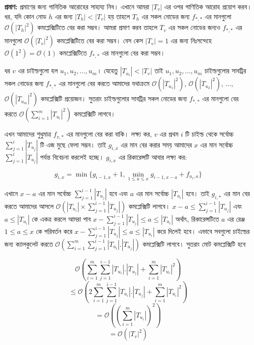 \textbf{প্রমাণ:}
প্রমাণের জন্য গানিতিক আরোহের সাহায্য নিব। এখানে আমরা \(|T_{v}|\) এর ওপর গাণিতিক আরোহ প্রয়োগ করব। ধর, যদি কোন নোড \(h\) এর জন্য \(|T_{h}| < |T_{v}|\) হয় তাহলে \(T_{h}\) এর সকল নোডের জন্য \(f_{*, *}\) এর মানগুলো \(\mathcal{O}(|T_{h}|^{2})\) কমপ্লেক্সিটিতে বের করা সম্ভব।  আমরা প্রমাণ করব তাহলে \(T_{v}\) এর সকল নোডের জন্যও \(f_{*, *}\) এর মানগুলো \(\mathcal{O}(|T_{v}|^{2})\) কমপ্লেক্সিটিতে বের করা সম্ভব। বেস কেস \(|T_{v}| = 1\) এর জন্য নিঃসন্দেহে \(\mathcal{O} (1^{2}) = \mathcal{O} (1)\) কমপ্লেক্সিটিতে \(f_{*, *}\) এর মানগুলো বের করা সম্ভব।  

ধর \(v\) এর চাইল্ডগুলো হল \(u_{1}, u_{2}, \dots, u_{m}\)। যেহেতু \(|T_{u_{i}}| < |T_{v}|\) তাই \(u_{1}, u_{2}, \dots, u_{m}\) চাইল্ডগুলোর সাবট্রির সকল নোডের জন্য \(f_{*, *}\) এর মানগুলো বের করতে আমাদের যথাক্রমে $\mathcal{O}(|T_{u_{1}}|^{2})$, $\mathcal{O}(|T_{u_{2}}|^{2})$, $\dots$, $\mathcal{O}(|T_{u_{m}}|^{2})$ কমপ্লেক্সিটি প্রয়োজন। সুতরাং চাইল্ডগুলোর সাবট্রির সকল নোডের জন্য \(f_{*, *}\) এর মানগুলো বের করতে \(\mathcal{O} \left ( \sum_{i = 1}^{m} |T_{u_{i}}|^{2} \right )\) কমপ্লেক্সিটি লাগবে। 

এখন আমাদের শুধুমাত্র \(f_{v, *}\) এর মানগুলো বের করা বাকি। লক্ষ্য কর, \(v\) এর প্রথম \(i\) টি চাইল্ড থেকে সর্বোচ্চ \(\sum_{j = 1}^{i} |T_{u_{j}}|\) টি এজ মুছে ফেলা সম্ভব। তাই \(g_{i, x}\) এর মান বের করার সময় আমাদের \(x\) এর মান সর্বোচ্চ \(\sum_{j = 1}^{i} |T_{u_{j}}|\) পর্যন্ত বিবেচনা করলেই হচ্ছে। \(g_{i, x}\) এর রিকারেন্সটি আবার লক্ষ্য কর:

\[g_{i, x} = \min \lbrace g_{i - 1, x} + 1, \min_{1 \leq a \leq x} g_{i - 1, x - a} + f_{u_{i}, a} \rbrace\]

এখানে \(x - a\) এর মান সর্বোচ্চ \(\sum_{j = 1}^{i - 1} |T_{u_{j}}|\) হবে এবং \(a\) এর মান সর্বোচ্চ \(|T_{u_{i}}|\) হবে। তাই \(g_{i, *}\) এর মান বের করতে আমাদের আসলে \(\mathcal{O} \left( |T_{u_{i}}| \times \sum_{j = 1}^{i - 1} |T_{u_{j}}|\right) \) কমপ্লেক্সিটি লাগবে। \(x - a \leq \sum_{j = 1}^{i - 1} |T_{u_{j}}|\) এবং \(a \leq |T_{u_{i}}|\) কে একত্র করলে আমরা পাব \(x - \sum_{j = 1}^{i - 1} |T_{u_{j}}| \leq a \leq |T_{u_{i}}|\) অর্থাৎ, রিকারেন্সটিতে \(a\) এর রেঞ্জ \(1 \leq a \leq x\) কে পরিবর্তন করে \(x - \sum_{j = 1}^{i - 1} |T_{u_{j}}| \leq a \leq |T_{u_{i}}|\)  করে দিলেই হবে। এভাবে সবগুলো চাইল্ডের জন্য ক্যালকুলেট করতে \(\mathcal{O} \left ( \sum_{i = 1}^{m} \sum_{j = 1}^{i - 1} |T_{u_{i}}|.|T_{u_{j}}| \right ) \) কমপ্লেক্সিটি লাগবে। সুতরাং মোট কমপ্লেক্সিটি হবে

\[\mathcal{O} \left ( \sum_{i = 1}^{m} \sum_{j = 1}^{i - 1} |T_{u_{i}}|.|T_{u_{j}}| + \sum_{i = 1}^{m} |T_{u_{i}}|^{2} \right )\]
\[\leq \mathcal{O} \left ( 2 \sum_{i = 1}^{m} \sum_{j = 1}^{i - 1} |T_{u_{i}}|.|T_{u_{j}}| + \sum_{i = 1}^{m} |T_{u_{i}}|^{2} \right )\]
\[= \mathcal{O} \left ( \left ( \sum_{i = 1}^{m} |T_{u_{i}}| \right ) ^ {2} \right )\]
\[= \mathcal{O} \left ( |T_{v}| ^ {2} \right )\]

